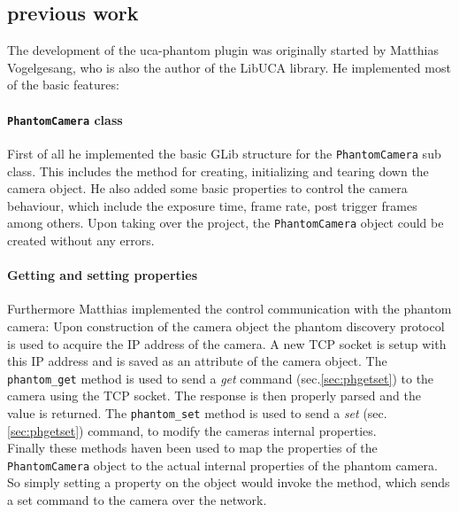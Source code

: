 \subsection{previous work}
The development of the uca-phantom plugin was originally started by Matthias Vogelgesang, who is also the author of the LibUCA library. He implemented most of the basic features:
\paragraph{\texttt{PhantomCamera} class}
First of all he implemented the basic GLib structure for the \texttt{PhantomCamera} sub class. This includes the method for creating, initializing and tearing down the camera object. He also added some basic properties to control the camera behaviour, which include the exposure time, frame rate, post trigger frames among others. Upon taking over the project, the \texttt{PhantomCamera} object could be created without any errors.
\paragraph{Getting and setting properties}
Furthermore Matthias implemented the control communication with the phantom camera: Upon construction of the camera object the phantom discovery protocol is used to acquire the IP address of the camera. A new TCP socket is setup with this IP address and is saved as an attribute of the camera object. The \texttt{phantom\_get} method is used to send a \textit{get} command (sec.\ref{sec:phgetset}) to the camera using the TCP socket. The response is then properly parsed and the value is returned. The \texttt{phantom\_set} method is used to send a \textit{set} (sec.\ref{sec:phgetset}) command, to modify the cameras internal properties.\\
Finally these methods haven been used to map the properties of the \texttt{PhantomCamera} object to the actual internal properties of the phantom camera. So simply setting a property on the object would invoke the method, which sends a set command to the camera over the network.
